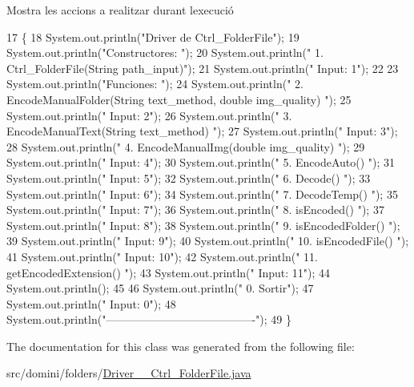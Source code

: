 Mostra les accions a realitzar durant l\textquotesingle{}execució 


\begin{DoxyCode}
17                                      \{
18         System.out.println(\textcolor{stringliteral}{"Driver de Ctrl\_FolderFile"});
19         System.out.println(\textcolor{stringliteral}{"Constructores: "});
20         System.out.println(\textcolor{stringliteral}{"     1. Ctrl\_FolderFile(String path\_input)"});
21         System.out.println(\textcolor{stringliteral}{"     Input: 1"});
22 
23         System.out.println(\textcolor{stringliteral}{"Funciones: "});
24         System.out.println(\textcolor{stringliteral}{"     2. EncodeManualFolder(String text\_method, double img\_quality) "});
25         System.out.println(\textcolor{stringliteral}{"     Input: 2"});
26         System.out.println(\textcolor{stringliteral}{"     3. EncodeManualText(String text\_method) "});
27         System.out.println(\textcolor{stringliteral}{"     Input: 3"});
28         System.out.println(\textcolor{stringliteral}{"     4. EncodeManualImg(double img\_quality) "});
29         System.out.println(\textcolor{stringliteral}{"     Input: 4"});
30         System.out.println(\textcolor{stringliteral}{"     5. EncodeAuto() "});
31         System.out.println(\textcolor{stringliteral}{"     Input: 5"});
32         System.out.println(\textcolor{stringliteral}{"     6. Decode() "});
33         System.out.println(\textcolor{stringliteral}{"     Input: 6"});
34         System.out.println(\textcolor{stringliteral}{"     7. DecodeTemp() "});
35         System.out.println(\textcolor{stringliteral}{"     Input: 7"});
36         System.out.println(\textcolor{stringliteral}{"     8. isEncoded() "});
37         System.out.println(\textcolor{stringliteral}{"     Input: 8"});
38         System.out.println(\textcolor{stringliteral}{"     9. isEncodedFolder() "});
39         System.out.println(\textcolor{stringliteral}{"     Input: 9"});
40         System.out.println(\textcolor{stringliteral}{"     10. isEncodedFile() "});
41         System.out.println(\textcolor{stringliteral}{"     Input: 10"});
42         System.out.println(\textcolor{stringliteral}{"     11. getEncodedExtension() "});
43         System.out.println(\textcolor{stringliteral}{"     Input: 11"});
44         System.out.println();
45 
46         System.out.println(\textcolor{stringliteral}{"     0. Sortir"});
47         System.out.println(\textcolor{stringliteral}{"     Input: 0"});
48         System.out.println(\textcolor{stringliteral}{"----------------------------------------"});
49     \}
\end{DoxyCode}


The documentation for this class was generated from the following file\+:\begin{DoxyCompactItemize}
\item 
src/domini/folders/\hyperlink{Driver____Ctrl__FolderFile_8java}{Driver\+\_\+\+\_\+\+Ctrl\+\_\+\+Folder\+File.\+java}\end{DoxyCompactItemize}

